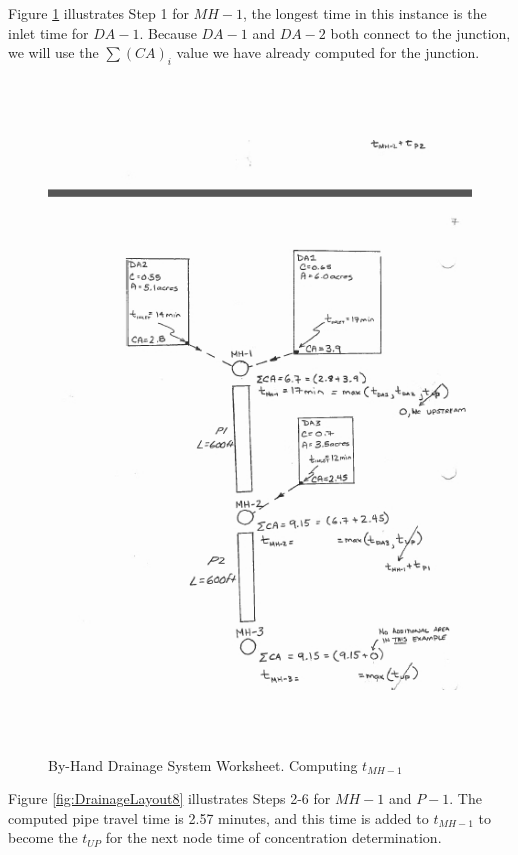 \documentclass[12pt]{article}
\begin{document}
\newpage
Figure \ref{fig:DrainageLayout7} illustrates Step 1 for $MH-1$, the longest time in this instance is the inlet time for $DA-1$.  Because $DA-1$ and $DA-2$ both connect to the junction, we will use the $\sum (CA)_i$ value we have already computed for the junction.
\begin{figure}[ht!] %
\centering
   \includegraphics[height=7in]{DrainageLayout7.jpg}
   \caption{By-Hand Drainage System Worksheet. Computing $t_{MH-1}$}
   \label{fig:DrainageLayout7} 
\end{figure}
\clearpage
Figure \ref{fig:DrainageLayout8} illustrates Steps 2-6 for $MH-1$ and $P-1$. 
The computed pipe travel time is 2.57 minutes, and this time is added to $t_{MH-1}$ to become the $t_{UP}$ for the next node time of concentration determination. 
\end{document}
